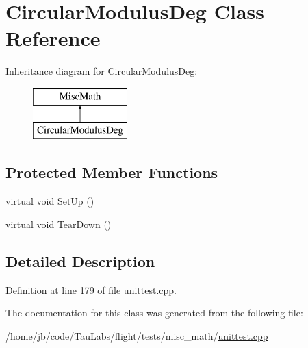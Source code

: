 \hypertarget{class_circular_modulus_deg}{\section{\-Circular\-Modulus\-Deg \-Class \-Reference}
\label{class_circular_modulus_deg}
}
\-Inheritance diagram for \-Circular\-Modulus\-Deg\-:\begin{figure}[H]
\begin{center}
\leavevmode
\includegraphics[height=2.000000cm]{class_circular_modulus_deg}
\end{center}
\end{figure}
\subsection*{\-Protected \-Member \-Functions}
\begin{DoxyCompactItemize}
\item 
virtual void \hyperlink{group___unit_tests_gade916660611f66dc899b964b8d064166}{\-Set\-Up} ()
\item 
virtual void \hyperlink{group___unit_tests_gab07ca9308f02057fa2623a51eb709aac}{\-Tear\-Down} ()
\end{DoxyCompactItemize}


\subsection{\-Detailed \-Description}


\-Definition at line 179 of file unittest.\-cpp.



\-The documentation for this class was generated from the following file\-:\begin{DoxyCompactItemize}
\item 
/home/jb/code/\-Tau\-Labs/flight/tests/misc\-\_\-math/\hyperlink{misc__math_2unittest_8cpp}{unittest.\-cpp}\end{DoxyCompactItemize}

